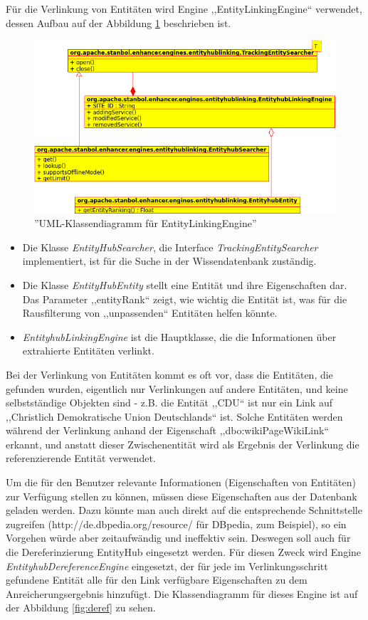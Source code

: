 Für die Verlinkung von Entitäten wird Engine ,,EntityLinkingEngine`` verwendet, dessen Aufbau auf der Abbildung \ref{fig:linking} beschrieben ist.

\begin{figure}[ht]
\centering
\includegraphics[width=\textwidth]{Bilder/classes-linking.png}
\caption{''UML-Klassendiagramm für EntityLinkingEngine''}
\label{fig:linking}
\end{figure}
\begin{itemize}
\item Die Klasse \textit{EntityHubSearcher}, die Interface \textit{TrackingEntitySearcher} implementiert, ist für die Suche in der Wissendatenbank zuständig.
\item Die Klasse \textit{EntityHubEntity} stellt eine Entität und ihre Eigenschaften dar. Das Parameter ,,entityRank`` zeigt, wie wichtig die Entität ist, was für die Rausfilterung von ,,unpassenden`` Entitäten helfen könnte.
\item \textit{EntityhubLinkingEngine} ist die Hauptklasse, die die Informationen über extrahierte Entitäten verlinkt.
\end{itemize}

Bei der Verlinkung von Entitäten kommt es oft vor, dass die Entitäten, die gefunden wurden, eigentlich nur Verlinkungen auf andere Entitäten, und keine selbstständige Objekten sind - z.B. die Entität ,,CDU`` ist nur ein Link auf ,,Christlich Demokratische Union Deutschlands`` ist. Solche Entitäten werden während der Verlinkung anhand der Eigenschaft ,,dbo:wikiPageWikiLink`` erkannt, und anstatt dieser Zwischenentität wird als Ergebnis der Verlinkung die referenzierende Entität verwendet.

Um die für den Benutzer relevante Informationen (Eigenschaften von Entitäten) zur Verfügung stellen zu können, müssen diese Eigenschaften aus der Datenbank geladen werden. Dazu könnte man auch direkt auf die entsprechende Schnittstelle zugreifen (http://de.dbpedia.org/resource/ für DBpedia, zum Beispiel), so ein Vorgehen würde aber zeitaufwändig und ineffektiv sein. Deswegen soll auch für die Dereferinzierung EntityHub eingesetzt werden. Für diesen Zweck wird Engine \textit{EntityhubDereferenceEngine} eingesetzt, der für jede im Verlinkungsschritt gefundene Entität alle für den Link verfügbare Eigenschaften zu dem Anreicherungsergebnis hinzufügt. Die Klassendiagramm für dieses Engine ist auf der Abbildung \ref{fig:deref} zu sehen. 

